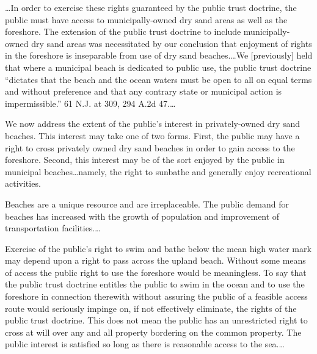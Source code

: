 

\dots In order to exercise these rights guaranteed by the public trust
doctrine, the public must have access to municipally-owned dry sand areas as
well as the foreshore. The extension of the public trust doctrine to include
municipally-owned dry sand areas was necessitated by our conclusion that
enjoyment of rights in the foreshore is inseparable from use of dry sand
beaches.\ldots We [previously] held that where a municipal beach is dedicated to
public use, the public trust doctrine ``dictates that the beach and the ocean
waters must be open to all on equal terms and without preference and that any
contrary state or municipal action is impermissible.'' 61 N.J. at 309,
294 A.2d 47.\dots

We now address the extent of the public's interest in privately-owned dry sand
beaches. This interest may take one of two forms. First, the public may have a
right to cross privately owned dry sand beaches in order to gain access to the
foreshore. Second, this interest may be of the sort enjoyed by the public in
municipal beaches\dots namely, the right to sunbathe and generally enjoy
recreational activities.

Beaches are a unique resource and are irreplaceable. The public demand for
beaches has increased with the growth of population and improvement of
transportation facilities.\dots

Exercise of the public's right to swim and bathe below the mean high water mark
may depend upon a right to pass across the upland beach. Without some means of
access the public right to use the foreshore would be meaningless. To say that
the public trust doctrine entitles the public to swim in the ocean and to use
the foreshore in connection therewith without assuring the public of a feasible
access route would seriously impinge on, if not effectively eliminate, the
rights of the public trust doctrine. This does not mean the public has an
unrestricted right to cross at will over any and all property bordering on the
common property. The public interest is satisfied so long as there is reasonable
access to the sea.\dots

